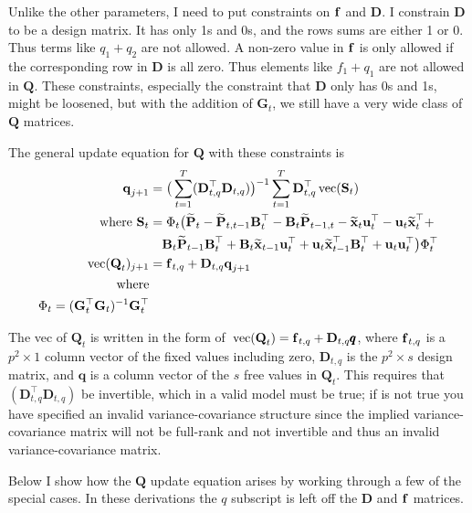 \documentclass[]{article}
\def\UPS{\mbox{\boldmath $\Upsilon$}}
\def\BB{\mbox{$\mathbf B$}}	\def\bb{\mbox{$\mathbf b$}} \def\Bb{\mbox{$\mathbf J$}} \def\Ba{\mbox{$\mathbf L$}} \def\Bm{\UPS}
\def\DD{\mbox{$\mathbf D$}}	\def\dd{\mbox{$\mathbf d$}}
\def\GG{\mbox{$\mathbf G$}}	\def\gg{\mbox{$\mathbf g$}}
\def\PP{\mbox{$\mathbf P$}}  \def\pp{\mbox{$\mathbf p$}}
\def\QQ{\mbox{$\mathbf Q$}}	 \def\qq{\mbox{$\mathbf q$}} \def\Qb{\mbox{$\mathbf G$}}  \def\Qm{\mathbb{Q}}
\def\SS{\mbox{$\mathbf S$}}
\def\vec{\,\textup{\textrm{vec}}}
\def\hatxt{\widetilde{\mbox{$\mathbf x$}}_t}
\def\hatxtm{\widetilde{\mbox{$\mathbf x$}}_{t-1}}
\def\hatPt{\widetilde{\PP}_t}
\def\hatPtm{\widetilde{\PP}_{t-1}}
\def\hatPttm{\widetilde{\PP}_{t,t-1}}
\def\hatPtmt{\widetilde{\PP}_{t-1,t}}
\begin{document}
Unlike the other parameters, I need to put constraints on $\mbox{$\mathbf f$}$ and $\DD$.  I constrain $\DD$ to be a design matrix.  It has only 1s and 0s, and the rows sums are either 1 or 0. Thus terms like $q_1+q_2$ are not allowed.  A non-zero value in $\mbox{$\mathbf f$}$ is only allowed if the corresponding row in $\DD$ is all zero.  Thus elements like $f_1+q_1$ are not allowed in $\QQ$.  These constraints, especially the constraint that $\DD$ only has 0s and 1s, might be loosened, but with the addition of $\GG_t$, we still have a very wide class of $\QQ$ matrices.

The general update equation for $\QQ$ with these constraints is
\begin{equation}\label{eq:Q.general}
\begin{split}
\qq_{j+1} &= \big(\sum_{t=1}^T(\DD_{t,q}^\top\DD_{t,q})\big)^{-1} \sum_{t=1}^T\DD_{t,q}^\top\vec(\SS_t)\\
\text{where }\SS_t&=\Phi_t\big(\hatPt - \hatPttm \BB_t^\top - \BB_t\hatPtmt 
- \hatxt\uu_t^\top - \uu_t\hatxt^\top + \\
&\quad \BB_t\hatPtm\BB_t^\top + \BB_t\hatxtm\uu_t^\top + \uu_t\hatxtm^\top\BB_t^\top + \uu_t\uu_t^\top \big)\Phi_t^\top\\
\vec(\QQ_t)_{j+1}&=\ff_{t,q}+\DD_{t,q}\qq_{j+1} \\
\text{where}\\
\Phi_t = (\GG_t^\top\GG_t)^{-1}\GG_t^\top
\end{split}
\end{equation}

The vec of $\QQ_t$ is written in the form of $\vec(\QQ_t) = \ff_{t,q} + \DD_{t,q} \pmb{q}$, where $\mbox{$\mathbf f$}_{t,q}$ is a $p^2 \times 1$ column vector of the fixed values including zero, $\DD_{t,q}$ is the $p^2 \times s$ design matrix, and $\pmb{q}$ is a column vector of the $s$ free values in $\QQ_t$.  This requires that $(\DD_{t,q}^\top\DD_{t,q})$ be invertible, which in a valid model must be true; if is not true you have specified an invalid variance-covariance structure since the implied variance-covariance matrix will not be full-rank and not invertible and thus an invalid variance-covariance matrix.

Below I show how the $\QQ$ update equation arises by working through a few of the special cases.  In these derivations the $q$ subscript is left off the $\DD$ and $\mbox{$\mathbf f$}$ matrices.
\end{document}
